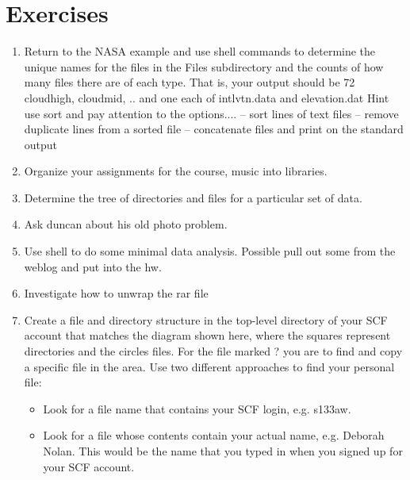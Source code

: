 \section{Exercises}
\begin{enumerate}
\item Return to the NASA example and use shell commands to determine
  the unique names for the files in the Files subdirectory and the
  counts of how many files there are of each type.  That is, your
  output should be 72 cloudhigh, cloudmid, .. and one each of
  intlvtn.data and elevation.dat  Hint use sort and pay attention to
  the options....   -- sort lines of text files
  -- remove duplicate lines from a sorted file
  -- concatenate files and print on the standard output

\item Organize your assignments for the course, music into libraries.

\item Determine the tree of directories and files for a particular set
  of data.

\item Ask duncan about his old photo problem.

\item Use shell to do some minimal data analysis. Possible pull out
  some from the weblog and put into the hw.

\item Investigate how to unwrap the rar file

\item Create a file and directory structure in the top-level
directory of your SCF account that matches the diagram shown here,
where the squares represent directories and the circles files.
For the file marked ? you are to find and copy a specific file
in the  area. Use two different approaches to
find your personal file:
\begin{itemize}
\item Look for a file name that contains your SCF login, e.g. s133aw.
\item Look for a file whose contents contain your actual name,
e.g. Deborah Nolan. This would be the name that you typed in
when you signed up for your SCF account.
\end{itemize}



\end{enumerate}
